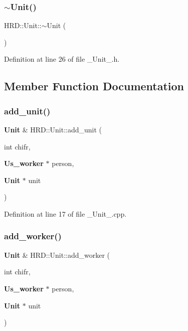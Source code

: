 \subsubsection{$\sim$\+Unit()}
{\footnotesize\ttfamily H\+R\+D\+::\+Unit\+::$\sim$\+Unit (\begin{DoxyParamCaption}{ }\end{DoxyParamCaption})\hspace{0.3cm}{\ttfamily [inline]}}



Definition at line 26 of file \+\_\+\+Unit\+\_\+.\+h.



\subsection{Member Function Documentation}
\mbox{\label{class_h_r_d_1_1_unit_a5f1c508ce722f12b45cfceda516df5e0}} 
\subsubsection{add\+\_\+unit()}
{\footnotesize\ttfamily \textbf{ Unit} \& H\+R\+D\+::\+Unit\+::add\+\_\+unit (\begin{DoxyParamCaption}\item[{int}]{chifr,  }\item[{\textbf{ Us\+\_\+worker} $\ast$}]{person,  }\item[{\textbf{ Unit} $\ast$}]{unit }\end{DoxyParamCaption})}



Definition at line 17 of file \+\_\+\+Unit\+\_\+.\+cpp.

\mbox{\label{class_h_r_d_1_1_unit_a3fdb4538b6b906a5045eacd6c556ec32}} 
\subsubsection{add\+\_\+worker()}
{\footnotesize\ttfamily \textbf{ Unit} \& H\+R\+D\+::\+Unit\+::add\+\_\+worker (\begin{DoxyParamCaption}\item[{int}]{chifr,  }\item[{\textbf{ Us\+\_\+worker} $\ast$}]{person,  }\item[{\textbf{ Unit} $\ast$}]{unit }\end{DoxyParamCaption})}



